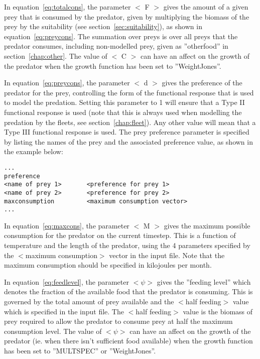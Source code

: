 \documentclass[10pt,twoside]{book}
\begin{document}
\bigskip
In equation~\ref{eq:totalcons}, the parameter $<$ F $>$ gives the amount of a given prey that is consumed by the predator, given by multiplying the biomass of the prey by the suitability (see section~\ref{sec:suitability}), as shown in equation~\ref{eq:preycons}.  The summation over preys is over all preys that the predator consumes, including non-modelled prey, given as ''otherfood'' in section~\ref{chap:other}.  The value of $<$ C $>$ can have an affect on the growth of the predator when the growth function has been set to ''WeightJones''.

\bigskip
In equation~\ref{eq:preycons}, the parameter $<$ d $>$ gives the preference of the predator for the prey, controlling the form of the functional response that is used to model the predation.  Setting this parameter to 1 will ensure that a Type II functional response is used (note that this is always used when modelling the predation by the fleets, see section~\ref{chap:fleet}).  Any other value will mean that a Type III functional response is used.  The prey preference parameter is specified by listing the names of the prey and the associated preference value, as shown in the example below:

{\small\begin{verbatim}
...
preference
<name of prey 1>       <preference for prey 1>
<name of prey 2>       <preference for prey 2>
maxconsumption         <maximum consumption vector>
...
\end{verbatim}}

In equation~\ref{eq:maxcons}, the parameter $<$ M $>$ gives the maximum possible consumption for the predator on the current timestep.  This is a function of temperature and the length of the predator, using the 4 parameters specified by the $<$maximum consumption$>$ vector in the input file.  Note that the maximum consumption should be specified in kilojoules per month.

\bigskip
In equation~\ref{eq:feedlevel}, the parameter $<\psi>$ gives the ''feeding level'' which denotes the fraction of the available food that the predator is consuming.  This is governed by the total amount of prey available and the $<$half feeding$>$ value which is specified in the input file.  The $<$half feeding$>$ value is the biomass of prey required to allow the predator to consume prey at half the maximum consumption level.  The value of $<\psi>$ can have an affect on the growth of the predator (ie. when there isn't sufficient food available) when the growth function has been set to ''MULTSPEC'' or ''WeightJones''.
\end{document}

